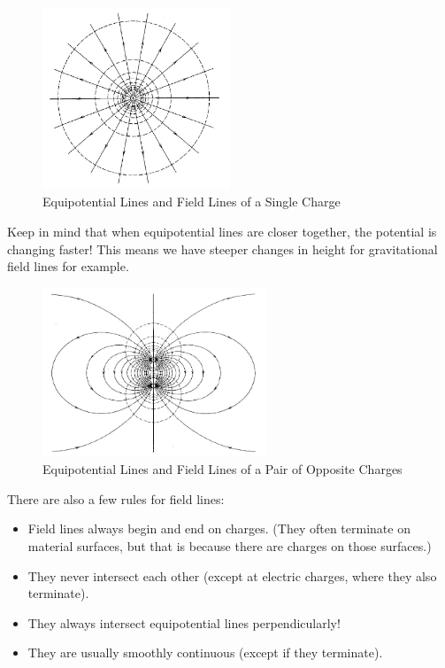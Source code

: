 \begin{figure}[h]
    \begin{center}
        \includegraphics[width=0.5\textwidth]{./Exp1/pic/image3.png}
    \end{center}
    \caption{Equipotential Lines and Field Lines of a Single Charge}
    \label{fig:equi_field}
\end{figure}

Keep in mind that when equipotential lines are closer together, the potential is changing faster! This means we have steeper changes in height for gravitational field lines for example.

\begin{figure}[h]
    \begin{center}
        \includegraphics[width=0.6\textwidth]{./Exp1/pic/image4.png}
    \end{center}
    \caption{Equipotential Lines and Field Lines of a Pair of Opposite Charges}
    \label{fig:field_dipole}
\end{figure}

There are also a few rules for field lines:
\begin{itemize}
    \item Field lines always begin and end on charges. (They often terminate on material surfaces, but that is because there are charges on those surfaces.)
    \item They never intersect each other (except at electric charges, where they also terminate).
    \item They always intersect equipotential lines perpendicularly!
    \item They are usually smoothly continuous (except if they terminate).
\end{itemize}

